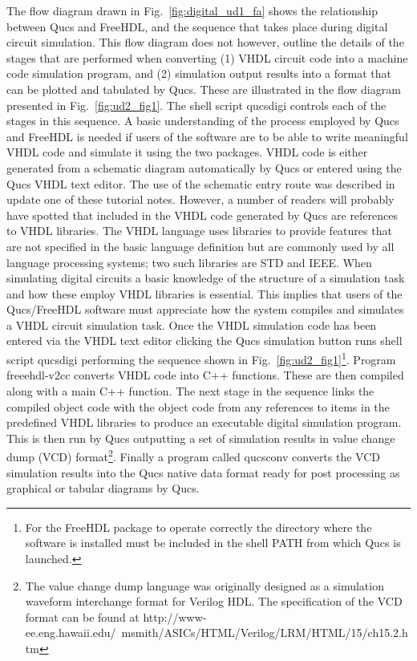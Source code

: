 
The flow diagram drawn in Fig.~\ref{fig:digital_ud1_fa} shows the relationship between Qucs and FreeHDL, and the sequence that takes place during digital circuit simulation.  This flow diagram does not however, outline the details of the stages that are performed when converting (1) VHDL circuit code into a machine code simulation program, and (2) simulation output results into a format that can be plotted and tabulated by Qucs.  These are illustrated in the flow diagram presented in Fig.~\ref{fig:ud2_fig1}.   The shell script qucsdigi controls each of the stages in this sequence.  A basic understanding of the process employed by Qucs and FreeHDL is needed if users of the software are to be able to write meaningful VHDL code and simulate it using the two packages.  VHDL code is either generated from a schematic diagram automatically by Qucs or entered using the Qucs VHDL text editor.  The use of the schematic entry route was described in update one of these tutorial notes.  However, a number of readers will probably have spotted that included in the VHDL code generated by Qucs are references to VHDL libraries.  The VHDL language uses libraries to provide features that are not specified in the basic language definition but are commonly used by all language processing systems; two such libraries are STD and IEEE.  When simulating digital circuits a basic knowledge of the structure of a simulation task and how these employ VHDL libraries is essential.  This implies that users of the Qucs/FreeHDL software must appreciate how the system compiles and simulates a VHDL circuit simulation task.  Once the VHDL simulation code has been entered via the VHDL text editor clicking the Qucs simulation button runs shell script qucsdigi performing the sequence shown in Fig.~\ref{fig:ud2_fig1}\footnote{For the FreeHDL package to operate correctly the directory where the software is installed must be included in the shell PATH from which Qucs is launched.}. Program freeehdl-v2cc converts VHDL code into C++ functions.  These are then compiled along with a main C++ function.  The next stage in the sequence links the compiled object code with the object code from any references to items in the predefined VHDL libraries to produce an executable digital simulation program.  This is then run by Qucs outputting a set of simulation results in value change dump (VCD) format\footnote{The value change dump language was originally designed as a simulation waveform interchange format for Verilog HDL. The specification of the VCD format can be found at http://www-ee.eng.hawaii.edu/~msmith/ASICs/HTML/Verilog/LRM/HTML/15/ch15.2.htm }. Finally a program called qucsconv converts the VCD simulation results into the Qucs native data format ready for post processing as graphical or tabular diagrams by Qucs.


